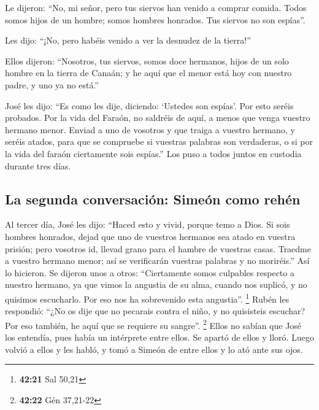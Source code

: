 \begin{paracol}{2}
 Le dijeron: ``No, mi señor, pero tus siervos han venido
a comprar comida.  Todos somos hijos de un hombre; somos
hombres honrados. Tus siervos no son espías''.

 Les dijo: ``¡No, pero habéis venido a ver la desnudez de
la tierra!''

 Ellos dijeron: ``Nosotros, tus siervos, somos doce
hermanos, hijos de un solo hombre en la tierra de Canaán; y he aquí que
el menor está hoy con nuestro padre, y uno ya no está.''

 José les dijo: ``Es como les dije, diciendo: `Ustedes
son espías'.  Por esto seréis probados. Por la vida del
Faraón, no saldréis de aquí, a menos que venga vuestro hermano menor.
 Enviad a uno de vosotros y que traiga a vuestro hermano,
y seréis atados, para que se compruebe si vuestras palabras son
verdaderas, o si por la vida del faraón ciertamente sois espías.''
 Los puso a todos juntos en custodia durante tres días.

\hypertarget{la-segunda-conversaciuxf3n-simeuxf3n-como-rehuxe9n}{%
\subsection{La segunda conversación: Simeón como
rehén}\label{la-segunda-conversaciuxf3n-simeuxf3n-como-rehuxe9n}}

 Al tercer día, José les dijo: ``Haced esto y vivid,
porque temo a Dios.  Si sois hombres honrados, dejad que
uno de vuestros hermanos sea atado en vuestra prisión; pero vosotros id,
llevad grano para el hambre de vuestras casas.  Traedme a
vuestro hermano menor; así se verificarán vuestras palabras y no
moriréis.'' Así lo hicieron.  Se dijeron unos a otros:
``Ciertamente somos culpables respecto a nuestro hermano, ya que vimos
la angustia de su alma, cuando nos suplicó, y no quisimos escucharlo.
Por eso nos ha sobrevenido esta angustia''. \footnote{\textbf{42:21} Sal
  50,21}  Rubén les respondió: ``¿No os dije que no
pecarais contra el niño, y no quisisteis escuchar? Por eso también, he
aquí que se requiere su sangre''. \footnote{\textbf{42:22} Gén 37,21-22}
 Ellos no sabían que José los entendía, pues había un
intérprete entre ellos.  Se apartó de ellos y lloró.
Luego volvió a ellos y les habló, y tomó a Simeón de entre ellos y lo
ató ante sus ojos.


\end{paracol}
